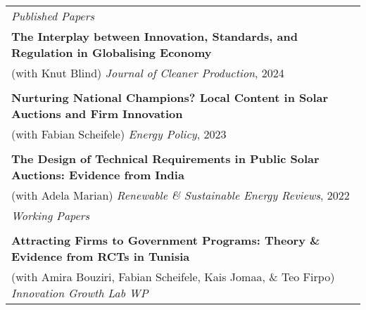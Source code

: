 \documentclass[10pt,a4paper]{article}
\begin{document}
\begin{tabular}{@{}p{\textwidth}@{}}
\vspace{0.5mm}
\textit{\large Published Papers} \\
\vspace{0.1mm}
\hspace{5mm}\textbf{The Interplay between Innovation, Standards, and Regulation in Globalising Economy} \\
\hspace{5mm}(with Knut Blind) \textit{Journal of Cleaner Production}, 2024 \\
\vspace{0.1mm} \\
\hspace{5mm}\textbf{Nurturing National Champions? Local Content in Solar Auctions and Firm Innovation} \\
\hspace{5mm}(with Fabian Scheifele) \textit{Energy Policy}, 2023 \\
\vspace{0.1mm} \\
\hspace{5mm}\textbf{The Design of Technical Requirements in Public Solar Auctions: Evidence from India} \\
\hspace{5mm}(with Adela Marian) \textit{Renewable \& Sustainable Energy Reviews}, 2022 \\

\vspace{1mm}
\textit{\large Working Papers} \\
\vspace{0.5mm} \\
\hspace{5mm}\textbf{Attracting Firms to Government Programs: Theory \& Evidence from RCTs in Tunisia} \\
\hspace{5mm}(with Amira Bouziri, Fabian Scheifele, Kais Jomaa, \& Teo Firpo) \textit{Innovation Growth Lab WP} \\


\end{tabular}
\end{document}

